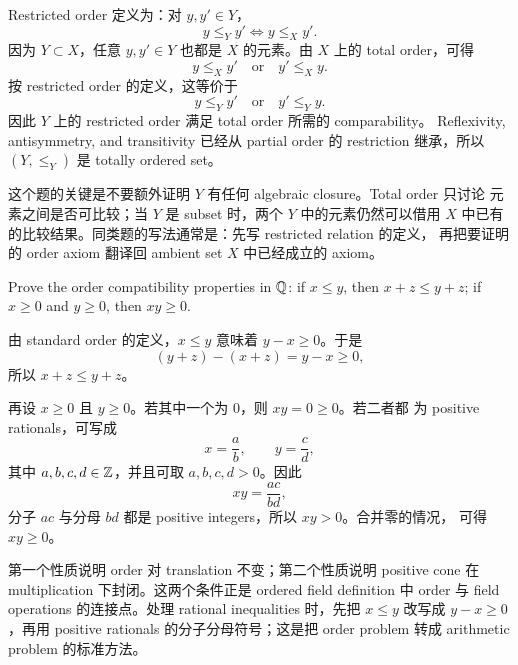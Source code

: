\begin{solution}
Restricted order 定义为：对 \(y,y'\in Y\)，
\[
  y\leq_Y y' \Longleftrightarrow y\leq_X y'.
\]
因为 \(Y\subset X\)，任意 \(y,y'\in Y\) 也都是 \(X\) 的元素。由 \(X\) 上的
total order，可得
\[
  y\leq_X y' \quad\text{or}\quad y'\leq_X y.
\]
按 restricted order 的定义，这等价于
\[
  y\leq_Y y' \quad\text{or}\quad y'\leq_Y y.
\]
因此 \(Y\) 上的 restricted order 满足 total order 所需的 comparability。
Reflexivity, antisymmetry, and transitivity 已经从 partial order 的 restriction
继承，所以 \((Y,\leq_Y)\) 是 totally ordered set。
\end{solution}

\begin{explanation}
这个题的关键是不要额外证明 \(Y\) 有任何 algebraic closure。Total order 只讨论
元素之间是否可比较；当 \(Y\) 是 subset 时，两个 \(Y\) 中的元素仍然可以借用
\(X\) 中已有的比较结果。同类题的写法通常是：先写 restricted relation 的定义，
再把要证明的 order axiom 翻译回 ambient set \(X\) 中已经成立的 axiom。
\end{explanation}

\begin{exerciseblock}
Prove the order compatibility properties in \(\mathbb{Q}\): if \(x\leq y\), then
\(x+z\leq y+z\); if \(x\geq0\) and \(y\geq0\), then \(xy\geq0\).
\end{exerciseblock}

\begin{solution}
由 standard order 的定义，\(x\leq y\) 意味着 \(y-x\geq0\)。于是
\[
  (y+z)-(x+z)=y-x\geq0,
\]
所以 \(x+z\leq y+z\)。

再设 \(x\geq0\) 且 \(y\geq0\)。若其中一个为 \(0\)，则 \(xy=0\geq0\)。若二者都
为 positive rationals，可写成
\[
  x=\frac{a}{b},\qquad y=\frac{c}{d},
\]
其中 \(a,b,c,d\in\mathbb{Z}\)，并且可取 \(a,b,c,d>0\)。因此
\[
  xy=\frac{ac}{bd},
\]
分子 \(ac\) 与分母 \(bd\) 都是 positive integers，所以 \(xy>0\)。合并零的情况，
可得 \(xy\geq0\)。
\end{solution}

\begin{explanation}
第一个性质说明 order 对 translation 不变；第二个性质说明 positive cone 在
multiplication 下封闭。这两个条件正是 ordered field definition 中 order 与
field operations 的连接点。处理 rational inequalities 时，先把 \(x\leq y\)
改写成 \(y-x\geq0\)，再用 positive rationals 的分子分母符号；这是把 order
problem 转成 arithmetic problem 的标准方法。
\end{explanation}


